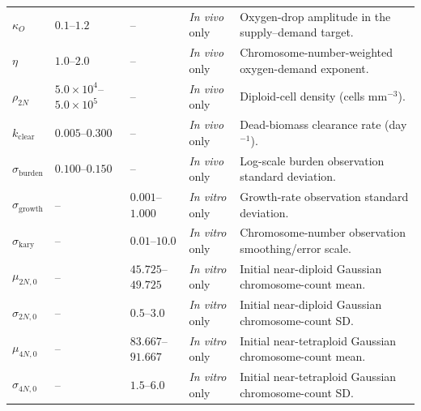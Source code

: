 \begin{longtable}{@{}p{}p{}p{}p{}p{}@{}}
$\kappa_O$ & $0.1$--$1.2$ & -- & \textit{In vivo} only & Oxygen-drop amplitude in the supply--demand target. \\
$\eta$ & $1.0$--$2.0$ & -- & \textit{In vivo} only & Chromosome-number-weighted oxygen-demand exponent. \\
$\rho_{2N}$ & $5.0\times10^4$--$5.0\times10^5$ & -- & \textit{In vivo} only & Diploid-cell density (cells mm$^{-3}$). \\
$k_{\mathrm{clear}}$ & $0.005$--$0.300$ & -- & \textit{In vivo} only & Dead-biomass clearance rate (day$^{-1}$). \\
$\sigma_{\mathrm{burden}}$ & $0.100$--$0.150$ & -- & \textit{In vivo} only & Log-scale burden observation standard deviation. \\
$\sigma_{\mathrm{growth}}$ & -- & $0.001$--$1.000$ & \textit{In vitro} only & Growth-rate observation standard deviation. \\
$\sigma_{\mathrm{kary}}$ & -- & $0.01$--$10.0$ & \textit{In vitro} only & Chromosome-number observation smoothing/error scale. \\
$\mu_{2N,0}$ & -- & $45.725$--$49.725$ & \textit{In vitro} only & Initial near-diploid Gaussian chromosome-count mean. \\
$\sigma_{2N,0}$ & -- & $0.5$--$3.0$ & \textit{In vitro} only & Initial near-diploid Gaussian chromosome-count SD. \\
$\mu_{4N,0}$ & -- & $83.667$--$91.667$ & \textit{In vitro} only & Initial near-tetraploid Gaussian chromosome-count mean. \\
$\sigma_{4N,0}$ & -- & $1.5$--$6.0$ & \textit{In vitro} only & Initial near-tetraploid Gaussian chromosome-count SD. \\

\bottomrule
\end{longtable}
\endgroup
